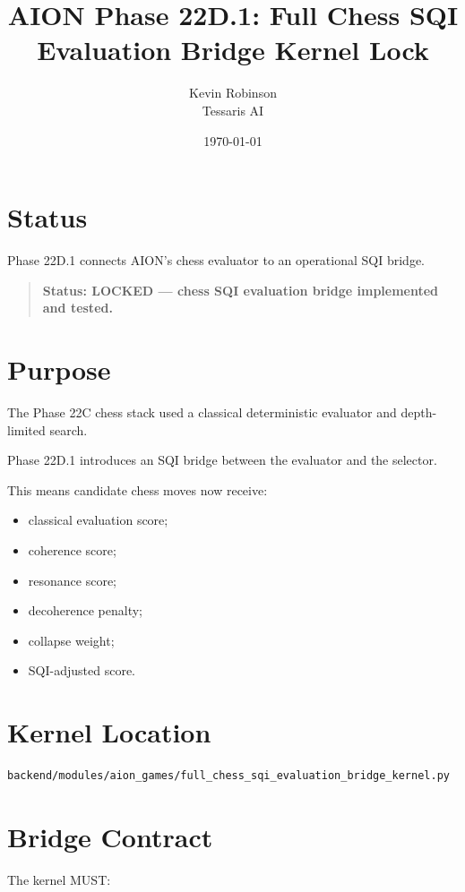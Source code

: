 \documentclass[11pt,a4paper]{article}
\title{\textbf{AION Phase 22D.1: Full Chess SQI Evaluation Bridge Kernel Lock}}
\author{Kevin Robinson\\Tessaris AI}
\date{\today}
\begin{document}
\maketitle

\section{Status}

Phase 22D.1 connects AION's chess evaluator to an operational SQI bridge.

\begin{quote}
\textbf{Status: LOCKED --- chess SQI evaluation bridge implemented and tested.}
\end{quote}

\section{Purpose}

The Phase 22C chess stack used a classical deterministic evaluator and depth-limited search.

Phase 22D.1 introduces an SQI bridge between the evaluator and the selector.

This means candidate chess moves now receive:

\begin{itemize}
  \item classical evaluation score;
  \item coherence score;
  \item resonance score;
  \item decoherence penalty;
  \item collapse weight;
  \item SQI-adjusted score.
\end{itemize}

\section{Kernel Location}

\begin{verbatim}
backend/modules/aion_games/full_chess_sqi_evaluation_bridge_kernel.py
\end{verbatim}

\section{Bridge Contract}

The kernel MUST:
\end{document}
